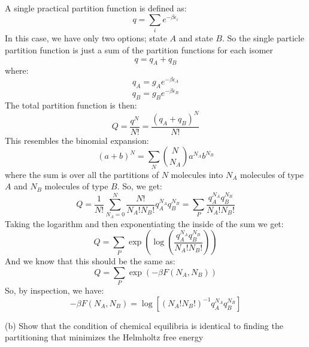 \documentclass[12pt]{article}
\begin{document}
\subsection{}
A single practical partition function is defined as:
\begin{equation}
q = \sum_{i} e^{-\beta \epsilon_i}
\end{equation}
In this case, we have only two options; state $A$ and state $B$. So the single particle partition function is just a sum of the partition functions for each isomer
\begin{equation}
q = q_A + q_B
\end{equation}
where:
\begin{equation}
q_A = g_A e^{-\beta \epsilon_A}
\end{equation}
\begin{equation}
q_B = g_B e^{-\beta \epsilon_B}
\end{equation}
The total partition function is then:
\begin{equation}
Q=\frac{q^{N}}{N !} = \frac{\left(q_A + q_B\right)^{N}}{N !}
\end{equation}
This resembles the binomial expansion:
\begin{equation}
\left(a+b\right)^N = \sum_{N} \binom{N}{N_A} a^{N_A} b^{N_B}
\end{equation}
where the sum is over all the partitions of $N$ molecules into $N_{A}$ molecules of type $A$ and $N_{B}$ molecules of type $B$. So, we get:
\begin{equation}
Q=\frac{1}{N!}\sum_{N_A = 0}^{
N} \frac{N!}{N_A! N_B!} q_A^{N_A} q_B^{N_B} = \sum_{P} \frac{q_A^{N_A} q_B^{N_B}}{N_A! N_B!}
\end{equation}
Taking the logarithm and then exponentiating the inside of the sum we get:
\begin{equation}
Q = \sum_{P} \exp{\left(\log{\left(\frac{q_A^{N_A} q_B^{N_B}}{N_A! N_B!}\right)}\right)}
\end{equation}
And we know that this should be the same as:
\begin{equation}
Q = \sum_{P} \exp{\left(-\beta F\left(N_{A}, N_{B}\right)\right)}
\end{equation}
So, by inspection, we have:
\begin{equation}
-\beta F\left(N_{A}, N_{B}\right)=\log \left[\left(N_{A} ! N_{B} !\right)^{-1} q_{A}^{N_{A}} q_{B}^{N_{B}}\right]
\end{equation}


(b) Show that the condition of chemical equilibria is identical to finding the partitioning that minimizes the Helmholtz free energy
\end{document}
